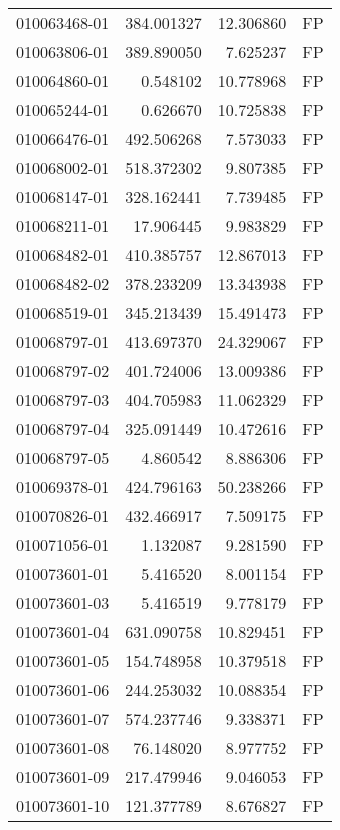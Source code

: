 \begin{tabular}{lrrl}
010063468-01 &  384.001327 &      12.306860 &   FP \\
010063806-01 &  389.890050 &       7.625237 &   FP \\
010064860-01 &    0.548102 &      10.778968 &   FP \\
010065244-01 &    0.626670 &      10.725838 &   FP \\
010066476-01 &  492.506268 &       7.573033 &   FP \\
010068002-01 &  518.372302 &       9.807385 &   FP \\
010068147-01 &  328.162441 &       7.739485 &   FP \\
010068211-01 &   17.906445 &       9.983829 &   FP \\
010068482-01 &  410.385757 &      12.867013 &   FP \\
010068482-02 &  378.233209 &      13.343938 &   FP \\
010068519-01 &  345.213439 &      15.491473 &   FP \\
010068797-01 &  413.697370 &      24.329067 &   FP \\
010068797-02 &  401.724006 &      13.009386 &   FP \\
010068797-03 &  404.705983 &      11.062329 &   FP \\
010068797-04 &  325.091449 &      10.472616 &   FP \\
010068797-05 &    4.860542 &       8.886306 &   FP \\
010069378-01 &  424.796163 &      50.238266 &   FP \\
010070826-01 &  432.466917 &       7.509175 &   FP \\
010071056-01 &    1.132087 &       9.281590 &   FP \\
010073601-01 &    5.416520 &       8.001154 &   FP \\
010073601-03 &    5.416519 &       9.778179 &   FP \\
010073601-04 &  631.090758 &      10.829451 &   FP \\
010073601-05 &  154.748958 &      10.379518 &   FP \\
010073601-06 &  244.253032 &      10.088354 &   FP \\
010073601-07 &  574.237746 &       9.338371 &   FP \\
010073601-08 &   76.148020 &       8.977752 &   FP \\
010073601-09 &  217.479946 &       9.046053 &   FP \\
010073601-10 &  121.377789 &       8.676827 &   FP \\

\end{tabular}
